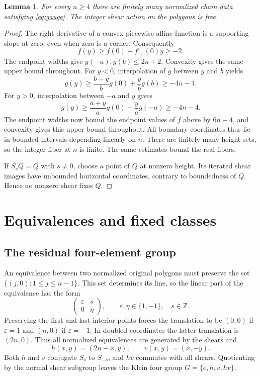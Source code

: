 \documentclass[11pt]{article}
\newtheorem{lemma}[theorem]{Lemma}
\theoremstyle{remark}
\numberwithin{equation}{section}
\newcommand{\Z}{\mathbb Z}
\begin{document}
\begin{lemma}\label{lem:finite}
For every $n\geq4$ there are finitely many normalized chain data satisfying
\eqref{eq:gauge}. The integer shear action on the polygons is free.
\end{lemma}

\begin{proof}
The right derivative of a convex piecewise affine function is a supporting
slope at zero, even when zero is a corner. Consequently
\[
 f(y)\geq f(0)+f'_+(0)y\geq-2.
\]
The endpoint widths give $g(-a),g(b)\leq2n+2$.
Convexity gives the same upper bound throughout.
For $y<0$, interpolation of $g$ between $y$ and $b$ yields
\[
 g(y)\geq \frac{b-y}{b}g(0)+\frac{y}{b}g(b)\geq-4n-4.
\]
For $y>0$, interpolation between $-a$ and $y$ gives
\[
 g(y)\geq \frac{a+y}{a}g(0)-\frac{y}{a}g(-a)\geq-4n-4.
\]
The endpoint widths now bound the endpoint values of $f$ above by
$6n+4$, and convexity gives this upper bound throughout.
All boundary coordinates thus lie in bounded intervals depending
linearly on $n$. There are finitely many height sets, so the integer
fiber at $n$ is finite. The same estimates bound the real fibers.

If $S_sQ=Q$ with $s\ne0$, choose a point of $Q$ at nonzero height.
Its iterated shear images have unbounded horizontal coordinates, contrary
to boundedness of $Q$. Hence no nonzero shear fixes $Q$.
\end{proof}

\section{Equivalences and fixed classes}\label{sec:group}

\subsection{The residual four-element group}

An equivalence between two normalized original polygons must preserve the
set $\{(j,0):1\leq j\leq n-1\}$.
This set determines its line, so the linear part of the equivalence has the
form
\[
 \begin{pmatrix}\varepsilon&s\\0&\eta\end{pmatrix},
 \qquad \varepsilon,\eta\in\{1,-1\},\quad s\in\Z.
\]
Preserving the first and last interior points forces the translation to be
$(0,0)$ if $\varepsilon=1$ and $(n,0)$ if $\varepsilon=-1$.
In doubled coordinates the latter translation is $(2n,0)$.
Thus all normalized equivalences are generated by the shears and
\begin{equation}\label{eq:reflections}
 h(x,y)=(2n-x,y),\qquad v(x,y)=(x,-y).
\end{equation}
Both $h$ and $v$ conjugate $S_s$ to $S_{-s}$, and $hv$ commutes with all
shears. Quotienting by the normal shear subgroup leaves the Klein four group
$G=\{e,h,v,hv\}$.
\end{document}
